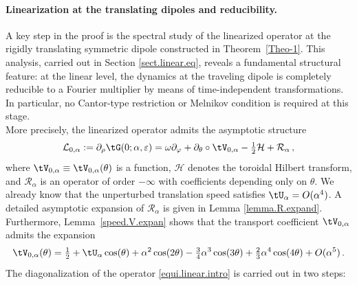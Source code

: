 \documentclass[a4paper,reqno,10pt]{article}
\begin{document}
\paragraph{Linearization at the translating dipoles and reducibility.}
A key step in the proof is the spectral study of the linearized operator at the rigidly
translating symmetric dipole constructed in \mbox{Theorem \ref{Theo-1}.} 
This analysis, carried out in Section \ref{sect.linear.eq}, reveals a fundamental structural feature:
at the linear level, the dynamics at  the traveling dipole is completely reducible 
to a Fourier multiplier by means of {time-independent} transformations. 
In particular, no Cantor-type restriction or Melnikov condition is required at this stage.
\\
More precisely, the linearized operator admits the asymptotic structure
\begin{equation}\label{equi.linear.intro}
    \mathcal{L}_{0,\alpha}
:= \partial_\rho \tG(0;\alpha,\varepsilon)
=
\omega \partial_\varphi
+
\partial_\theta \circ \tV_{0,\alpha}
-\tfrac{1}{2}\mathcal{H}
+
\mathcal{R}_\alpha\,,
\end{equation}
where $\tV_{0,\alpha}\equiv \tV_{0,\alpha}(\theta)$ is a function,  $\mathcal{H}$ denotes the toroidal Hilbert transform, 
and $\mathcal{R}_\alpha$ is an operator of order $-\infty$ with coefficients depending only on $\theta$. We already know that the unperturbed translation speed satisfies $\tU_{\alpha}=O(\alpha^4)$.
A detailed asymptotic expansion of $\mathcal{R}_\alpha$ is given in Lemma \ref{lemma.R.expand}. 
Furthermore, Lemma~\ref{speed.V.expan} shows that the transport coefficient 
$\tV_{0,\alpha}$ admits the expansion
$$
 \tV_{0,\alpha}(\theta)= \tfrac12 + \tU_{\alpha}\cos(\theta) +\alpha^2\cos(2\theta) -\tfrac34 \alpha^3 \cos(3\theta)  + \tfrac{2}{3}\alpha^4\cos(4\theta)  + O(\alpha^5) \,.
$$
The diagonalization of the operator \eqref{equi.linear.intro} is carried out in two steps:
\end{document}

